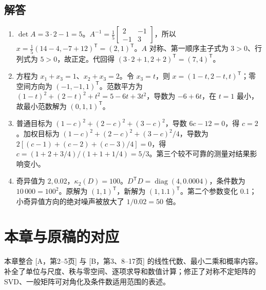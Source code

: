 \subsection*{解答}
\begin{enumerate}
\item $\det A=3\cdot2-1=5$。$A^{-1}=\frac15\begin{bmatrix}2&-1\\-1&3\end{bmatrix}$，所以 $x=\frac15(14-4,-7+12)^\mathsf T=(2,1)^\mathsf T$。$A$ 对称、第一顺序主子式为 $3>0$、行列式为 $5>0$，故正定。代回得 $(3\cdot2+1,2+2)^\mathsf T=(7,4)^\mathsf T$。
\item 方程为 $x_1+x_3=1$、$x_2+x_3=2$。令 $x_3=t$，则 $x=(1-t,2-t,t)^\mathsf T$；零空间方向为 $(-1,-1,1)^\mathsf T$。范数平方为 $(1-t)^2+(2-t)^2+t^2=5-6t+3t^2$，导数为 $-6+6t$，在 $t=1$ 最小，故最小范数解为 $(0,1,1)^\mathsf T$。
\item 普通目标为 $(1-c)^2+(2-c)^2+(3-c)^2$，导数 $6c-12=0$，得 $c=2$。加权目标为 $(1-c)^2+(2-c)^2+(3-c)^2/4$，导数为 $2[(c-1)+(c-2)+(c-3)/4]=0$，得 $c=(1+2+3/4)/(1+1+1/4)=5/3$。第三个较不可靠的测量对结果影响变小。
\item 奇异值为 $2,0.02$，$\kappa_2(D)=100$。$D^\mathsf TD=\operatorname{diag}(4,0.0004)$，条件数为 $10\,000=100^2$。原解为 $(1,1)^\mathsf T$，新解为 $(1,1.1)^\mathsf T$。第二个参数变化 0.1；小奇异值方向的绝对噪声被放大了 $1/0.02=50$ 倍。
\end{enumerate}

\section*{本章与原稿的对应}
本章整合 [A，第2--5页] 与 [B，第3、8--17页] 的线性代数、最小二乘和概率内容。补全了单位与尺度、秩与零空间、逐项求导和数值计算；修正了对称不定矩阵的 SVD、一般矩阵可对角化及条件数适用范围的表述。
